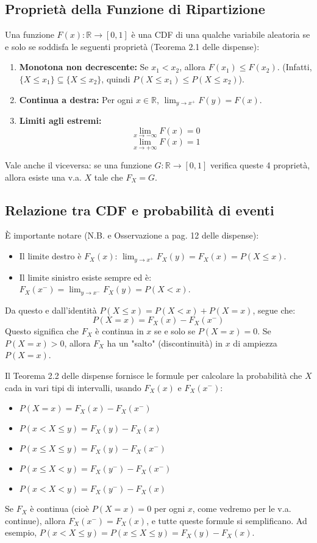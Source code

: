 \subsection{Proprietà della Funzione di Ripartizione}
Una funzione $F(x): \mathbb{R} \to [0,1]$ è una CDF di una qualche variabile aleatoria se e solo se soddisfa le seguenti proprietà (Teorema 2.1 delle dispense):
\begin{enumerate}
    \item \textbf{Monotona non decrescente:} Se $x_1 < x_2$, allora $F(x_1) \le F(x_2)$.
    (Infatti, $\{X \le x_1\} \subseteq \{X \le x_2\}$, quindi $P(X \le x_1) \le P(X \le x_2)$).
    \item \textbf{Continua a destra:} Per ogni $x \in \mathbb{R}$, $\lim_{y \to x^+} F(y) = F(x)$.
    \item \textbf{Limiti agli estremi:}
    \[ \lim_{x \to -\infty} F(x) = 0 \]
    \[ \lim_{x \to +\infty} F(x) = 1 \]
\end{enumerate}
Vale anche il viceversa: se una funzione $G: \mathbb{R} \to [0,1]$ verifica queste 4 proprietà, allora esiste una v.a. $X$ tale che $F_X = G$.

\subsection{Relazione tra CDF e probabilità di eventi}
È importante notare (N.B. e Osservazione a pag. 12 delle dispense):
\begin{itemize}
    \item Il limite destro è $F_X(x)$: $\lim_{y \to x^+} F_X(y) = F_X(x) = P(X \le x)$.
    \item Il limite sinistro esiste sempre ed è: $F_X(x^-) = \lim_{y \to x^-} F_X(y) = P(X < x)$.
\end{itemize}
Da questo e dall'identità $P(X \le x) = P(X < x) + P(X = x)$, segue che:
\[ P(X = x) = F_X(x) - F_X(x^-) \]
Questo significa che $F_X$ è continua in $x$ se e solo se $P(X=x)=0$. Se $P(X=x)>0$, allora $F_X$ ha un "salto" (discontinuità) in $x$ di ampiezza $P(X=x)$.

Il Teorema 2.2 delle dispense fornisce le formule per calcolare la probabilità che $X$ cada in vari tipi di intervalli, usando $F_X(x)$ e $F_X(x^-)$:
\begin{itemize}
    \item $P(X = x) = F_X(x) - F_X(x^-)$
    \item $P(x < X \le y) = F_X(y) - F_X(x)$
    \item $P(x \le X \le y) = F_X(y) - F_X(x^-)$
    \item $P(x \le X < y) = F_X(y^-) - F_X(x^-)$
    \item $P(x < X < y) = F_X(y^-) - F_X(x)$
\end{itemize}
Se $F_X$ è continua (cioè $P(X=x)=0$ per ogni $x$, come vedremo per le v.a. continue), allora $F_X(x^-) = F_X(x)$, e tutte queste formule si semplificano. Ad esempio, $P(x < X \le y) = P(x \le X \le y) = F_X(y) - F_X(x)$.

